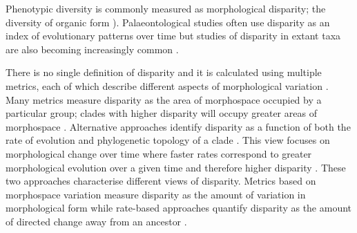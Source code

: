 \documentclass[12pt,a4paper]{article}
\begin{document}
Phenotypic diversity is commonly measured as morphological disparity; the diversity of organic form \citep{Foote1997,Erwin2007}). Palaeontological studies often use disparity as an index of evolutionary patterns over time \citep[e.g.][]{Brusatte2008, Ciampaglio2001, Wills1994} but studies of disparity in extant taxa are also becoming increasingly common \citep[e.g.][]{Harmon2003, Collar2011}. 

There is no single definition of disparity and it is calculated using multiple metrics, each of which describe different aspects of morphological variation \citep{Ciampaglio2001}. Many metrics measure disparity as the area of morphospace occupied by a particular group; clades with higher disparity will occupy greater areas of morphospace \citep[e.g.][]{Goswami2011, Brusatte2008}. Alternative approaches identify disparity as a function of both the rate of evolution and phylogenetic topology of a clade \citep{OMeara2006}. This view focuses on morphological change over time where faster rates correspond to greater morphological evolution over a given time and therefore higher disparity \citep{Price2013}. 
These two approaches characterise different views of disparity. Metrics based on morphospace variation measure disparity as the amount of variation in morphological form while rate-based approaches quantify disparity as the amount of directed change away from an ancestor \citep{Zelditch2012}.

\end{document}
